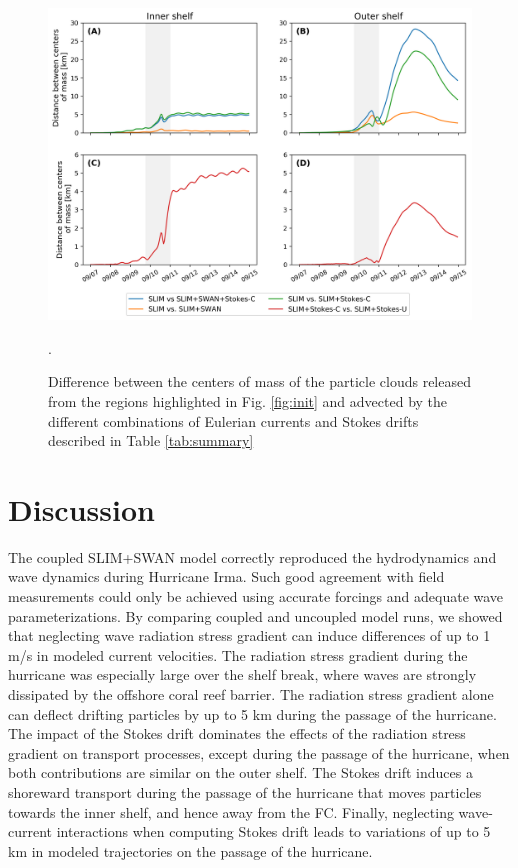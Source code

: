 \begin{figure}
    \centering
    \includegraphics[width=.99\textwidth]{chapters/irma/figures/trajectory_comparisons.png}
    \caption{Difference between the centers of mass of the particle clouds released from the regions highlighted in Fig. \ref{fig:init} and advected by the different combinations of Eulerian currents and Stokes drifts described in Table \ref{tab:summary}}.
    \label{fig:traj}
\end{figure}


\section{Discussion}
The coupled SLIM+SWAN model correctly reproduced the hydrodynamics and wave dynamics during Hurricane Irma. Such good agreement with field measurements could only be achieved using accurate forcings and adequate wave parameterizations. By comparing coupled and uncoupled model runs, we showed that neglecting wave radiation stress gradient can induce differences of up to 1 m/s in modeled current velocities. The radiation stress gradient during the hurricane was especially large over the shelf break, where waves are strongly dissipated by the offshore coral reef barrier. The radiation stress gradient alone can deflect drifting particles by up to 5 km during the passage of the hurricane. The impact of the Stokes drift dominates the effects of the radiation stress gradient on transport processes, except during the passage of the hurricane, when both contributions are similar on the outer shelf. The Stokes drift induces a shoreward transport during the passage of the hurricane that moves particles towards  the inner shelf, and hence away from the FC. Finally, neglecting wave-current interactions when computing Stokes drift leads to variations of up to 5 km in modeled trajectories on the passage of the hurricane.

